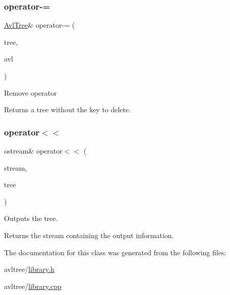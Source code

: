\subsubsection{\texorpdfstring{operator-\/=}{operator-=}}
{\footnotesize\ttfamily \mbox{\hyperlink{class_avl_tree}{Avl\+Tree}}\& operator-\/= (\begin{DoxyParamCaption}\item[{\mbox{\hyperlink{class_avl_tree}{Avl\+Tree}} \&}]{tree,  }\item[{int const}]{avl }\end{DoxyParamCaption})\hspace{0.3cm}{\ttfamily [friend]}}

Remove operator \begin{DoxyReturn}{Returns}
a tree without the key to delete. 
\end{DoxyReturn}
\mbox{\label{class_avl_tree_a294c728291996899d248fb8ea9c9a038}} 
\subsubsection{\texorpdfstring{operator$<$$<$}{operator<<}}
{\footnotesize\ttfamily ostream\& operator$<$$<$ (\begin{DoxyParamCaption}\item[{ostream \&}]{stream,  }\item[{\mbox{\hyperlink{class_avl_tree}{Avl\+Tree}} \&}]{tree }\end{DoxyParamCaption})\hspace{0.3cm}{\ttfamily [friend]}}

Outputs the tree. \begin{DoxyReturn}{Returns}
the stream containing the output information. 
\end{DoxyReturn}


The documentation for this class was generated from the following files\+:\begin{DoxyCompactItemize}
\item 
avltree/\mbox{\hyperlink{library_8h}{library.\+h}}\item 
avltree/\mbox{\hyperlink{library_8cpp}{library.\+cpp}}\end{DoxyCompactItemize}
